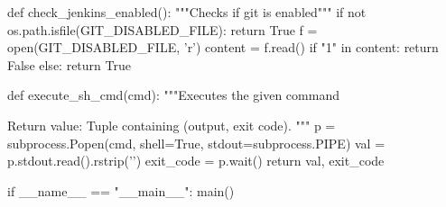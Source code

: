 \begin{pythoncode}[caption=Pre-receive git hook for checking for common mistakes]
def check_jenkins_enabled():
    """Checks if git is enabled"""
    if not os.path.isfile(GIT_DISABLED_FILE):
        return True
    f = open(GIT_DISABLED_FILE, 'r')
    content = f.read()
    if "1" in content:
        return False
    else:
        return True

def execute_sh_cmd(cmd):
    """Executes the given command

    Return value: Tuple containing (output, exit code).
    """
    p = subprocess.Popen(cmd, shell=True, stdout=subprocess.PIPE)
    val = p.stdout.read().rstrip('\n')
    exit_code = p.wait()
    return val, exit_code


if __name__ == "__main__":
    main()
\end{pythoncode}